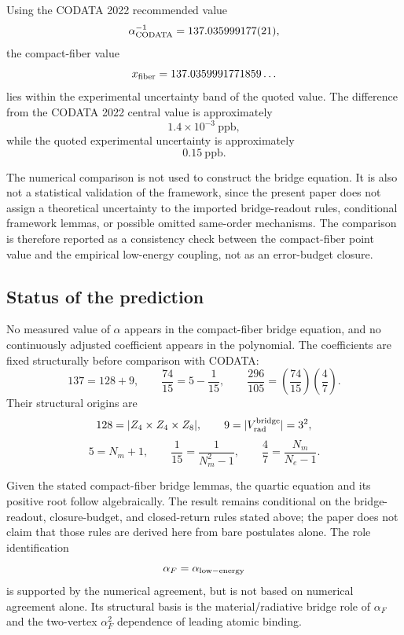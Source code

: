 Using the CODATA 2022 recommended value
\cite{NIST_CODATA_2022_alpha_inv,NIST_CODATA_2022_wallet}
\[
\alpha^{-1}_{\rm CODATA}=137.035999177(21),
\]
the compact-fiber value
\[
x_{\rm fiber}=137.0359991771859\ldots
\]
lies within the experimental uncertainty band of the quoted value. The
difference from the CODATA 2022 central value is approximately
\[
1.4\times10^{-3}\ \text{ppb},
\]
while the quoted experimental uncertainty is approximately
\[
0.15\ \text{ppb}.
\]

The numerical comparison is not used to construct the bridge equation.
It is also not a statistical validation of the framework, since the
present paper does not assign a theoretical uncertainty to the imported
bridge-readout rules, conditional framework lemmas, or possible omitted
same-order mechanisms. The comparison is therefore reported as a
consistency check between the compact-fiber point value and the empirical
low-energy coupling, not as an error-budget closure.

\subsection{Status of the prediction}

No measured value of \(\alpha\) appears in the compact-fiber bridge
equation, and no continuously adjusted coefficient appears in the
polynomial. The coefficients are fixed structurally before comparison
with CODATA:
\[
137=128+9,
\qquad
\frac{74}{15}
=
5-\frac1{15},
\qquad
\frac{296}{105}
=
\left(\frac{74}{15}\right)\left(\frac47\right).
\]
Their structural origins are
\[
128=|Z_4\times Z_4\times Z_8|,
\qquad
9=|V_{\rm rad}^{\rm bridge}|=3^2,
\]
\[
5=N_m+1,
\qquad
\frac1{15}=\frac1{N_m^2-1},
\qquad
\frac47=\frac{N_m}{N_e-1}.
\]

Given the stated compact-fiber bridge lemmas, the quartic equation and
its positive root follow algebraically. The result remains conditional
on the bridge-readout, closure-budget, and closed-return rules stated
above; the paper does not claim that those rules are derived here from
bare postulates alone. The role identification
\[
\alpha_F=\alpha_{\rm low-energy}
\]
is supported by the numerical agreement, but is not based on numerical
agreement alone. Its structural basis is the material/radiative bridge
role of \(\alpha_F\) and the two-vertex \(\alpha_F^2\) dependence of
leading atomic binding.